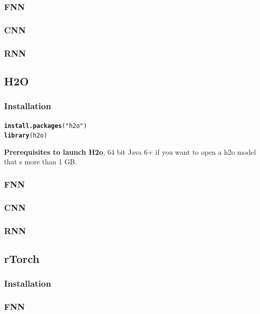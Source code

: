 \documentclass[6pt,letter]{article}\usepackage[]{graphicx}\usepackage[]{color}
\makeatletter
\newcommand{\hlstr}[1]{\textcolor[rgb]{0.192,0.494,0.8}{#1}}%
\newcommand{\hlstd}[1]{\textcolor[rgb]{0.345,0.345,0.345}{#1}}%
\newcommand{\hlkwd}[1]{\textcolor[rgb]{0.737,0.353,0.396}{\textbf{#1}}}%
\newenvironment{kframe}{%
 \def\at@end@of@kframe{}%
 \ifinner\ifhmode%
  \def\at@end@of@kframe{\end{minipage}}%
  \begin{minipage}{\columnwidth}%
 \fi\fi%
 \def\FrameCommand##1{\hskip\@totalleftmargin \hskip-\fboxsep
 \colorbox{shadecolor}{##1}\hskip-\fboxsep
     \hskip-\linewidth \hskip-\@totalleftmargin \hskip\columnwidth}%
 \MakeFramed {\advance\hsize-\width
   \@totalleftmargin\z@ \linewidth\hsize
   \@setminipage}}%
 {\par\unskip\endMakeFramed%
 \at@end@of@kframe}
\newenvironment{knitrout}{}{} %
\makeatother
\begin{document}
\subsubsection{FNN}
\subsubsection{CNN}
\subsubsection{RNN}

\subsection{H2O}
\subsubsection{Installation}
\begin{knitrout}
\color{fgcolor}\begin{kframe}
\begin{alltt}
\hlkwd{install.packages}\hlstd{(}\hlstr{"h2o"}\hlstd{)}
\hlkwd{library}\hlstd{(h2o)}
\end{alltt}
\end{kframe}
\end{knitrout}
\textbf{Prerequisites to launch H2o}, 64 bit Java 6+ if you want to open a h2o model that s more than 1 GB. 
\subsubsection{FNN}
\subsubsection{CNN}
\subsubsection{RNN}


\subsection{rTorch}
\subsubsection{Installation}
\subsubsection{FNN}
\end{document}
